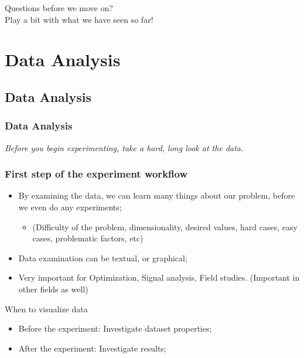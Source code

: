 \documentclass[10pt]{beamer}
\begin{document}
\begin{frame}
  \begin{center}
    Questions before we move on?\\
    Play a bit with what we have seen so far!
  \end{center}
\end{frame}

\section{Data Analysis}
\subsection{Data Analysis}
\begin{frame}
  \frametitle{Data Analysis}
  \begin{center}
    {\it Before you begin experimenting, take a hard, long look at the
      data.}
  \end{center}
\end{frame}

\begin{frame}
  \frametitle{First step of the experiment workflow}
  \begin{itemize}
    \item By examining the data, we can learn many things about our
      problem, before we even do any experiments;
      \begin{itemize}
      \item (Difficulty of the problem, dimensionality, desired values,
        hard cases, easy cases, problematic factors, etc)
      \end{itemize}
    \item Data examination can be textual, or graphical;
    \item Very important for Optimization, Signal analysis, Field
      studies. (Important in other fields as well)
  \end{itemize}
  \begin{block}{When to visualize data}
    \begin{itemize}
    \item Before the experiment: Investigate dataset properties;
    \item After the experiment: Investigate results;
    \end{itemize}
  \end{block}
\end{frame}
\end{document}
